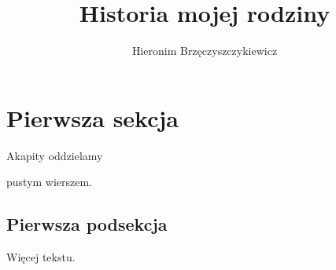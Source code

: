 \documentclass[12pt]{article} %
\title{Historia mojej rodziny}
\author{Hieronim Brzęczyszczykiewicz}
\begin{document}
\maketitle         %

\tableofcontents   %

\section{Pierwsza sekcja}

Akapity oddzielamy

pustym wierszem.

\subsection{Pierwsza podsekcja}

Więcej tekstu.
\end{document}
